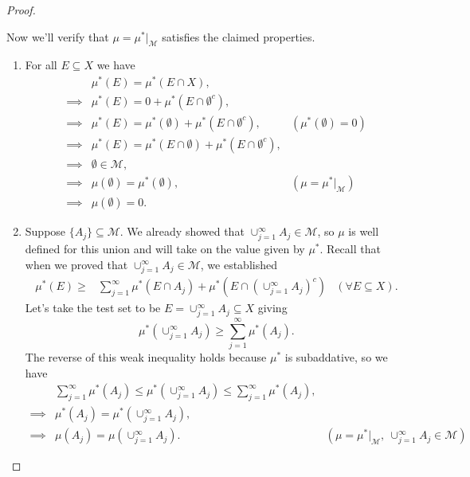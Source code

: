 \documentclass{article}
\theoremstyle{definition}
\begin{document}
\begin{proof}
\begin{enumerate}
	\end{enumerate}
	Now we'll verify that $\mu = \mu^*|_{\mathcal M}$ satisfies the claimed properties.
\begin{enumerate}
	\item For all $E\subseteq X$ we have 
	\begin{align*}
	&\mu^*(E) = \mu^*(E\cap X),\\
	\implies & \mu^*(E) = 0 + \mu^*(E\cap \emptyset^c),\\
	\implies & \mu^*(E) = \mu^*(\emptyset) + \mu^*(E\cap \emptyset^c), & (\mu^*(\emptyset) = 0)\\
	\implies & \mu^*(E) = \mu^*(E\cap \emptyset) + \mu^*(E\cap \emptyset^c),\\
	\implies & \emptyset \in\mathcal M,\\
	\implies & \mu(\emptyset) = \mu^*(\emptyset), & (\mu = \mu^*|_{\mathcal M})\\
	\implies & \mu(\emptyset ) = 0.
	\end{align*}
	\item Suppose  $\{A_j\} \subseteq\mathcal M$. We already showed that $\cup_{j=1}^\infty A_j\in \mathcal M$, so $\mu$ is well defined for this union and will take on the value given by $\mu^*$. Recall that when we proved that $\cup_{j=1}^\infty A_j\in \mathcal M$, we established 
	\begin{align*}
	\mu^*(E) \ge& \sum_{j=1}^\infty\mu^*(E\cap A_j)+\mu^*(E\cap  (\cup_{j=1}^\infty A_j)^c) &(\forall E\subseteq X).
	\end{align*}
	Let's take the test set to be $E = \cup_{j=1}^\infty A_j\subseteq X$ giving 
	$$ \mu^*\left(\cup_{j=1}^\infty A_j\right) \ge \sum_{j=1}^\infty \mu^*(A_j).$$ The reverse of this weak inequality holds because $\mu^*$ is subaddative, so we have 
	\begin{align*}
	&	\sum_{j=1}^\infty \mu^*(A_j) \le \mu^*\left(\cup_{j=1}^\infty A_j\right) \le \sum_{j=1}^\infty \mu^*(A_j),\\
	\implies & \mu^*(A_j) = \mu^*\left(\cup_{j=1}^\infty A_j\right),\\
		\implies & \mu(A_j) = \mu\left(\cup_{j=1}^\infty A_j\right). & (\mu = \mu^*|_{\mathcal M},\ \cup_{j=1}^\infty A_j\in\mathcal M)
	\end{align*}
	
\end{enumerate}
\end{proof}
\end{document}
